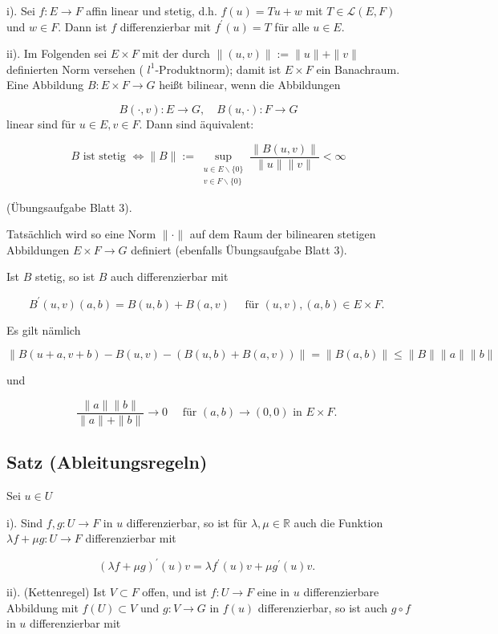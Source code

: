 \documentclass[10pt, letterpaper]{article}
\begin{document}
i). Sei $f: E \rightarrow F$ affin linear und stetig, d.h. $f(u)=T u+w$ mit $T \in \mathcal{L}(E, F)$ und $w \in F$. Dann ist $f$ differenzierbar mit $f^{\prime}(u)=T$ für alle $u \in E$.

ii). Im Folgenden sei $E \times F$ mit der durch $\|(u, v)\|:=\|u\|+\|v\|$ definierten Norm versehen ( $l^{1}$-Produktnorm); damit ist $E \times F$ ein Banachraum. Eine Abbildung $B: E \times F \rightarrow G$ heißt bilinear, wenn die Abbildungen

$$
B(\cdot, v): E \rightarrow G, \quad B(u, \cdot): F \rightarrow G
$$
linear sind für $u \in E, v \in F$. Dann sind äquivalent:

$$
B \text { ist stetig } \Longleftrightarrow\|B\|:=\sup _{\substack{u \in E \backslash\{0\} \\ v \in F \backslash\{0\}}} \frac{\|B(u, v)\|}{\|u\|\|v\|}<\infty
$$

(Übungsaufgabe Blatt 3).

Tatsächlich wird so eine Norm $\|\cdot\|$ auf dem Raum der bilinearen stetigen Abbildungen $E \times F \rightarrow G$ definiert (ebenfalls Übungsaufgabe Blatt 3).

Ist $B$ stetig, so ist $B$ auch differenzierbar mit

$$
B^{\prime}(u, v)(a, b)=B(u, b)+B(a, v) \quad \text { für }(u, v),(a, b) \in E \times F \text {. }
$$

Es gilt nämlich

$$
\|B(u+a, v+b)-B(u, v)-(B(u, b)+B(a, v))\|=\|B(a, b)\| \leq\|B\|\|a\|\|b\|
$$

und

$$
\frac{\|a\|\|b\|}{\|a\|+\|b\|} \rightarrow 0 \quad \text { für }(a, b) \rightarrow(0,0) \text { in } E \times F \text {. }
$$

\subsection*{Satz (Ableitungsregeln)}

Sei $u \in U$

i). Sind $f, g: U \rightarrow F$ in $u$ differenzierbar, so ist für $\lambda, \mu \in \mathbb{R}$ auch die Funktion $\lambda f+\mu g: U \rightarrow F$ differenzierbar mit

$$
(\lambda f+\mu g)^{\prime}(u) v=\lambda f^{\prime}(u) v+\mu g^{\prime}(u) v \text {. }
$$

ii). (Kettenregel) Ist $V \subset F$ offen, und ist $f: U \rightarrow F$ eine in $u$ differenzierbare Abbildung mit $f(U) \subset V$ und $g: V \rightarrow G$ in $f(u)$ differenzierbar, so ist auch $g \circ f$ in $u$ differenzierbar mit
\end{document}
